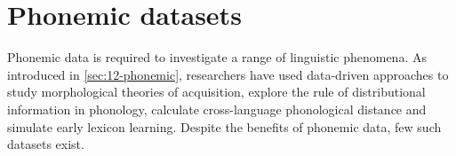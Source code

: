 \section{Phonemic datasets}\label{sec:13-phonemicdatasets}


Phonemic data is required to investigate a range of linguistic phenomena. As introduced in \cref{sec:12-phonemic}, researchers have used data-driven approaches to study morphological theories of acquisition, explore the rule of distributional information in phonology, calculate cross-language phonological distance and simulate early lexicon learning. Despite the benefits of phonemic data, few such datasets exist. 

